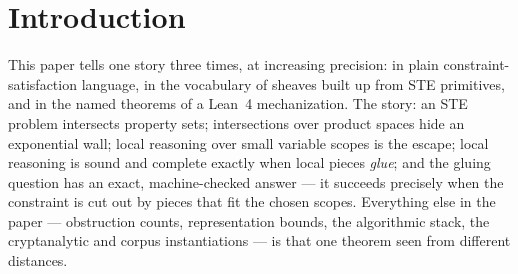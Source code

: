 \documentclass[11pt]{article}
\begin{document}
\begin{abstract}
gluing obstruction over every cover (),
so the linear-time local check is the complete gluing test for this
class, and the same theory says exactly where it would stop working.
Two further mechanized structures answer, metric-freely, what a
feasible family of subsets has that an infeasible one lacks: frame
corpora have Helly number~$2$ --- pairwise consistency already
certifies global consistency, provably false for general subset
families () --- and the must-coreference
reading of a corpus carries a submodular partition-lattice rank ---
Shannon's lattice of information with counting rank in place of
entropy ().
Throughout, a strict bright line separates machine-checked results
(each cites its Lean identifier) from conjecture, and every heavy
cochain construction is quarantined in a clearly marked appendix.
\end{abstract}

\section{Introduction}
\label{sec:intro}

This paper tells one story three times, at increasing precision: in
plain constraint-satisfaction language, in the vocabulary of sheaves
built up from STE primitives, and in the named theorems of a Lean~4
mechanization.  The story: an STE problem intersects property sets;
intersections over product spaces hide an exponential wall; local
reasoning over small variable scopes is the escape; local reasoning is
sound and complete exactly when local pieces \emph{glue}; and the
gluing question has an exact, machine-checked answer --- it succeeds
precisely when the constraint is cut out by pieces that fit the
chosen scopes.  Everything else in the paper --- obstruction counts,
representation bounds, the algorithmic stack, the cryptanalytic and
corpus instantiations --- is that one theorem seen from different
distances.
\end{document}
